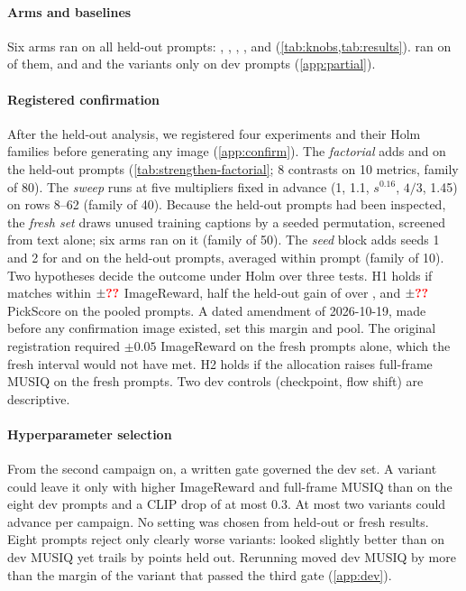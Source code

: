 \paragraph{Arms and baselines}
Six arms ran on all held-out prompts: \ntk, \dype, \segaofficial, \tempsb, \constancytm{} and \segactm{} (\cref{tab:knobs,tab:results}). \constancy{} ran on  of them, and \segapaper{} and the \aliastemp{} variants only on dev prompts (\cref{app:partial}).

\paragraph{Registered confirmation}
After the held-out analysis, we registered four experiments and their Holm families before generating any image (\cref{app:confirm}). The \emph{factorial} adds \ntktemp{} and \segabase{} on the held-out prompts (\cref{tab:strengthen-factorial}; 8 contrasts on 10 metrics, family of 80). The \emph{sweep} runs \tempsb{} at five multipliers fixed in advance (1, 1.1, $s^{0.16}$, $4/3$, 1.45) on rows 8--62 (family of 40). Because the held-out prompts had been inspected, the \emph{fresh set} draws  unused \afk{} training captions by a seeded permutation, screened from text alone; six arms ran on it (family of 50). The \emph{seed} block adds seeds 1 and 2 for \segaofficial{} and \tempsb{} on the held-out prompts, averaged within prompt (family of 10). Two hypotheses decide the outcome under Holm over three tests. H1 holds if \tempsb{} matches \segaofficial{} within $\pm\N{st@h@m@ir}$ ImageReward, half the held-out gain of \segaofficial{} over \dype, and $\pm\N{st@h@m@pick}$ PickScore on the  pooled prompts. A dated amendment of 2026-10-19, made before any confirmation image existed, set this margin and pool. The original registration required $\pm0.05$ ImageReward on the fresh prompts alone, which the fresh interval  would not have met. H2 holds if the allocation raises full-frame MUSIQ on the fresh prompts. Two dev controls (checkpoint, flow shift) are descriptive.

\paragraph{Hyperparameter selection}
From the second campaign on, a written gate governed the dev set. A variant could leave it only with higher ImageReward and full-frame MUSIQ than \segaofficial{} on the eight dev prompts and a CLIP drop of at most 0.3. At most two variants could advance per campaign. No setting was chosen from held-out or fresh results. Eight prompts reject only clearly worse variants: \tempsb{} looked slightly better than \segaofficial{} on dev MUSIQ yet trails by  points held out. Rerunning \segaofficial{} moved dev MUSIQ by more than the margin of the variant that passed the third gate (\cref{app:dev}).

